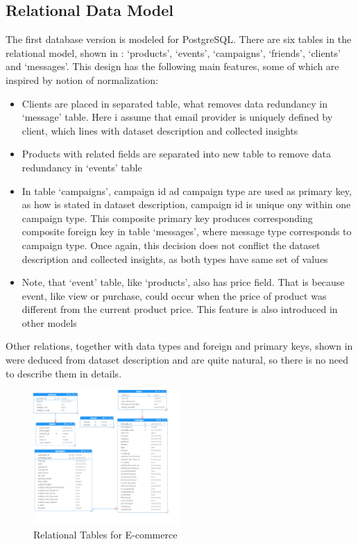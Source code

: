 \documentclass[conference]{IEEEtran}
\begin{document}
\subsection{Relational Data Model}
The first database version is modeled for PostgreSQL. There are six tables in the relational model, shown in : `products', `events', `campaigns', `friends', `clients' and `messages'. This design has the following main features, some of which are inspired by notion of normalization:
\begin{itemize}
    \item Clients are placed in separated table, what removes data redundancy in `message' table. Here i assume that email provider is uniquely defined by client, which lines with dataset description and collected insights
    \item Products with related fields are separated into new table to remove data redundancy in `events' table
    \item In table `campaigns', campaign id ad campaign type are used as primary key, as how is stated in dataset description, campaign id is unique ony within one campaign type. This composite primary key produces corresponding composite foreign key in table `messages', where message type corresponds to campaign type. Once again, this decision does not conflict the dataset description and collected insights, as both types have same set of values
    \item Note, that `event' table, like `products', also has price field. That is because event, like view or purchase, could occur when the price of product was different from the current product price. This feature is also  introduced in other models
\end{itemize}

Other relations, together with data types and foreign and primary keys, shown in  were deduced from dataset description and are quite natural, so there is no need to describe them in details.

\begin{figure}[htbp]
    \centerline{\includegraphics[width=0.5\textwidth]{../screenshots/PostgresModel.png}}
    \caption{Relational Tables for E-commerce}\label{fig:postgres_model}
\end{figure}
\end{document}
